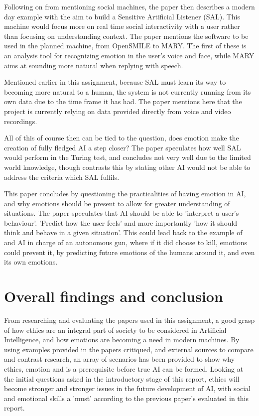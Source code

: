 \documentclass[article]{IEEEtran}
\begin{document}
Following on from mentioning social machines, the paper then describes a modern day example with the aim to build a Sensitive Artificial Listener (SAL). This machine would focus more on real time social interactivity with a user rather than focusing on understanding context. The paper mentions the software to be used in the planned machine, from OpenSMILE to MARY. The first of these is an analysis tool for recognizing emotion in the user's voice and face, while MARY aims at sounding more natural when replying with speech. \par
Mentioned earlier in this assignment, because SAL must learn its way to becoming more natural to a human, the system is not currently running from its own data due to the time frame it has had. The paper mentions here that the project is currently relying on data provided directly from voice and video recordings. \par
All of this of course then can be tied to the question, does emotion make the creation of fully fledged AI a step closer? The paper speculates how well SAL would perform in the Turing test, and concludes not very well due to the limited world knowledge, though contrasts this by stating other AI would not be able to address the criteria which SAL fulfils.\par
This paper concludes by questioning the practicalities of having emotion in AI, and why emotions should be present to allow for greater understanding of situations. The paper speculates that AI should be able to 'interpret a user's behaviour'. 'Predict how the user feels' and more importantly 'how it should think and behave in a given situation'. This could lead back to the example of and AI in charge of an autonomous gun, where if it did choose to kill, emotions could prevent it, by predicting future emotions of the humans around it, and even its own emotions. \par

\section{Overall findings and conclusion}
From researching and evaluating the papers used in this assignment, a good grasp of how ethics are an integral part of society to be considered in Artificial Intelligence, and how emotions are becoming a need in modern machines. By using examples provided in the papers critiqued, and external sources to compare and contrast research, an array of scenarios has been provided to show why ethics, emotion and  is a prerequisite before true AI can be formed.
Looking at the initial questions asked in the introductory stage of this report, ethics will become stronger and stronger issues in the future development of AI, with social and emotional skills a 'must' according to the previous paper's evaluated in this report.
\end{document}
